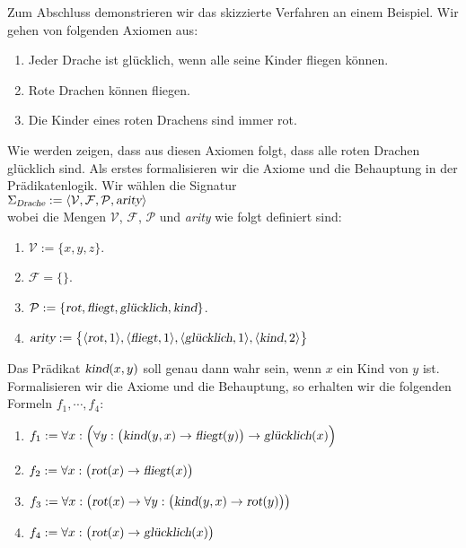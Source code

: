 \example
Zum Abschluss demonstrieren wir das skizzierte Verfahren an einem Beispiel.
Wir gehen von folgenden Axiomen aus:
\begin{enumerate}
\item Jeder Drache ist gl\"{u}cklich, wenn alle seine Kinder fliegen k\"{o}nnen.
\item Rote Drachen k\"{o}nnen fliegen.
\item Die Kinder eines roten Drachens sind immer rot.
\end{enumerate}
Wie werden zeigen, dass aus diesen Axiomen folgt, dass alle roten Drachen gl\"{u}cklich sind.
Als erstes formalisieren wir die Axiome und die Behauptung in der Pr\"{a}dikatenlogik.
Wir w\"{a}hlen die Signatur \\[0.2cm]
\hspace*{1.3cm}  $\Sigma_\textsl{Drache} := \langle \mathcal{V}, \mathcal{F}, \mathcal{P}, \textsl{arity} \rangle$ 
\\[0.2cm]
wobei die Mengen $\mathcal{V}$, $\mathcal{F}$, $\mathcal{P}$ und \textsl{arity} wie folgt definiert sind:
\begin{enumerate}
\item $\mathcal{V} := \{x,y,z\}$.
\item $\mathcal{F} = \{\}$.
\item $\mathcal{P} := \{ \textsl{rot}, \textsl{fliegt}, \textsl{gl\"{u}cklich}, \textsl{kind} \}$.
\item $\textsl{arity} := \bigl\{ \pair(\textsl{rot},1), \pair(\textsl{fliegt},1),
  \pair(\textsl{gl\"{u}cklich},1), \pair(\textsl{kind},2)\bigr\}$
\end{enumerate}
Das Pr\"{a}dikat  $\textsl{kind}(x,y)$ soll genau dann wahr sein, wenn $x$ ein Kind von $y$ ist.
Formalisieren wir die Axiome und die Behauptung, so erhalten wir die folgenden
Formeln $f_1, \cdots, f_4$:
\begin{enumerate}
\item $f_1 := \forall x: \Bigl(\forall y: \big(\textsl{kind}(y,x) \rightarrow \textsl{fliegt}(y)\big) \rightarrow \textsl{gl\"{u}cklich}(x)\Bigr)$
\item $f_2 := \forall x: \bigl(\textsl{rot}(x) \rightarrow \textsl{fliegt}(x)\bigr)$
\item $f_3 := \forall x: \bigl(\textsl{rot}(x) \rightarrow \forall y:\bigl( \textsl{kind}(y,x) \rightarrow \textsl{rot}(y)\bigr)\bigr)$
\item $f_4 := \forall x: \bigl(\textsl{rot}(x) \rightarrow \textsl{gl\"{u}cklich}(x)\bigr)$
\end{enumerate}
